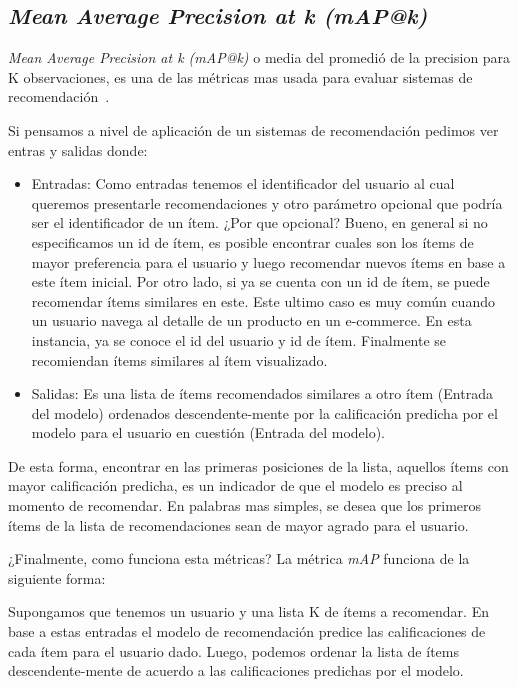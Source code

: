 \documentclass[11pt,a4paper,twoside]{thesis}
\begin{document}
\subsection{\textit{Mean Average Precision at k (mAP@k)}}

\textit{Mean Average Precision at k (mAP@k)} o media del promedió de la precision para K observaciones, es una de las métricas mas usada para evaluar sistemas de recomendación~\cite{map_at_k_1, map_at_k_2, map_at_k_3}.

Si pensamos a nivel de aplicación de un sistemas de recomendación pedimos ver
entras y salidas donde:

\begin{itemize}
	\item Entradas: Como entradas tenemos el identificador del usuario al cual queremos
	      presentarle recomendaciones y otro parámetro opcional que podría ser el
	      identificador de un ítem. ¿Por que opcional? Bueno, en general si no
	      especificamos un id de ítem, es posible encontrar cuales son los ítems de mayor
	      preferencia para el usuario y luego recomendar nuevos ítems en base a este ítem
	      inicial. Por otro lado, si ya se cuenta con un id de ítem, se puede recomendar
	      ítems similares en este. Este ultimo caso es muy común cuando un usuario navega
	      al detalle de un producto en un e-commerce. En esta instancia, ya se conoce el
	      id del usuario y id de ítem. Finalmente se recomiendan ítems similares al ítem
	      visualizado.
	\item Salidas: Es una lista de ítems recomendados similares a otro ítem (Entrada del
	      modelo) ordenados descendente-mente por la calificación predicha por el modelo
	      para el usuario en cuestión (Entrada del modelo).
\end{itemize}

De esta forma, encontrar en las primeras posiciones de la lista, aquellos ítems
con mayor calificación predicha, es un indicador de que el modelo es preciso al
momento de recomendar. En palabras mas simples, se desea que los primeros ítems
de la lista de recomendaciones sean de mayor agrado para el usuario.\newline

¿Finalmente, como funciona esta métricas? La métrica \textit{mAP\makeatletter@k} funciona de la siguiente forma: \newline

Supongamos que tenemos un usuario y una lista K de ítems a recomendar. En base
a estas entradas el modelo de recomendación predice las calificaciones de cada
ítem para el usuario dado. Luego, podemos ordenar la lista de ítems
descendente-mente de acuerdo a las calificaciones predichas por el modelo.
\end{document}
